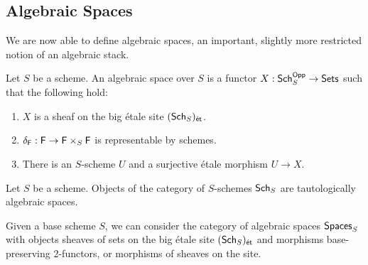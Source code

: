 \subsection{Algebraic Spaces}
We are now able to define algebraic spaces, an important, slightly more restricted notion of an algebraic stack. 
\begin{definition}\label{def: algebraic space}
    Let $S$ be a scheme. An algebraic space over $S$ is a functor $X:\mathsf{Sch}_{S}^{\mathsf{Opp}}\to\mathsf{Sets}$ such that the following hold:
    \begin{enumerate}[label=(\alph*)]
        \item $X$ is a sheaf on the big \'{e}tale site $(\mathsf{Sch}_{S})_{\mathsf{\acute{e}t}}$. 
        \item $\delta_{\mathsf{F}}:\mathsf{F}\to\mathsf{F}\times_{S}\mathsf{F}$ is representable by schemes. 
        \item There is an $S$-scheme $U$ and a surjective \'{e}tale morphism $U\to X$. 
    \end{enumerate}
\end{definition}
\begin{remark}
    Let $S$ be a scheme. Objects of the category of $S$-schemes $\mathsf{Sch}_{S}$ are tautologically algebraic spaces. 
\end{remark}
Given a base scheme $S$, we can consider the category of algebraic spaces $\mathsf{Spaces}_{S}$ with objects sheaves of sets on the big \'{e}tale site $(\mathsf{Sch}_{S})_{\mathsf{\acute{e}t}}$ and morphisms base-preserving 2-functors, or morphisms of sheaves on the site.  

